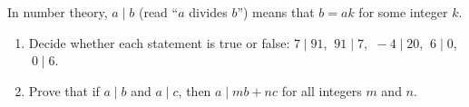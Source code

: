 In number theory, $a\mid b$ (read ``$a$ divides $b$'') means that $b=ak$ for some integer $k$.
\begin{enumerate}
\item[(a)] Decide whether each statement is true or false: $7\mid91$, $\ 91\mid7$, $\ -4\mid20$, $\ 6\mid0$, $\ 0\mid6$.
\item[(b)] Prove that if $a\mid b$ and $a\mid c$, then $a\mid mb+nc$ for all integers $m$ and $n$.
\end{enumerate}
